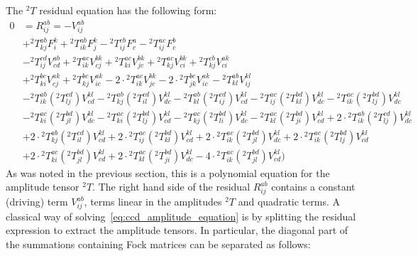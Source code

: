 The ${}^2 T$ residual equation has the following form:
\begin{equation}
\begin{split}
0 & = R^{ab}_{ij} = -V^{ab}_{ij} \\
& + {}^{2}T^{ab}_{kj} F^{k}_{i} 
+ {}^{2}T^{ab}_{ik} F^{k}_{j}
- {}^{2}T^{cb}_{ij} F^{a}_{c} 
- {}^{2}T^{ac}_{ij} F^{b}_{c} \\
& - {}^{2}T^{cd}_{ij}  V^{ab}_{cd}
+ {}^{2}T^{ac}_{ik}  V^{bk}_{cj} 
+ {}^{2}T^{ac}_{ki}  V^{bk}_{jc} 
+ {}^{2}T^{ac}_{kj}  V^{bk}_{ci} 
+ {}^{2}T^{cb}_{kj}  V^{ak}_{ci}\\
&+ {}^{2}T^{bc}_{ki}  V^{ak}_{cj} 
+ {}^{2}T^{bc}_{kj}  V^{ak}_{ic}
- 2 \cdot {}^{2}T^{ac}_{ik}  V^{bk}_{jc}
- 2 \cdot {}^{2}T^{bc}_{jk}  V^{ak}_{ic}
- {}^{2} T^{ab}_{kl}  V^{kl}_{ij} \\
&- {}^{2} T^{ab}_{ik}  ({}^{2} T^{cd}_{lj})  V^{kl}_{cd} 
- {}^{2} T^{ab}_{kj}  ({}^{2} T^{cd}_{il}) V^{kl}_{dc}
- {}^{2} T^{ab}_{kl}  ({}^{2} T^{cd}_{ij}) V^{kl}_{cd}
- {}^{2} T^{ac}_{ij}  ({}^{2} T^{bd}_{kl})  V^{kl}_{dc}
-  {}^{2} T^{ac}_{ik}  ({}^{2} T^{bd}_{lj}) V^{kl}_{dc} \\
&- {}^{2} T^{ac}_{ki}  ({}^{2} T^{bd}_{jl}) V^{kl}_{dc}
- {}^{2} T^{ac}_{ki}  ({}^{2} T^{bd}_{lj}) V^{kl}_{cd}
- {}^{2} T^{ac}_{kj}  ({}^{2} T^{bd}_{li}) V^{kl}_{dc}
-  {}^{2} T^{ac}_{kl}  ({}^{2} T^{bd}_{ji}) V^{kl}_{cd}
+ 2 \cdot {}^{2} T^{ab}_{ik} ({}^{2} T^{cd}_{lj})  V^{kl}_{dc}\\
&+ 2 \cdot {}^{2} T^{ab}_{kj} ({}^{2} T^{cd}_{il})  V^{kl}_{cd}
+ 2 \cdot {}^{2} T^{ac}_{ij} ({}^{2} T^{bd}_{kl})  V^{kl}_{cd}
+ 2 \cdot {}^{2} T^{ac}_{ik} ({}^{2} T^{bd}_{jl})  V^{kl}_{dc}
+ 2 \cdot {}^{2} T^{ac}_{ik} ({}^{2} T^{bd}_{lj})  V^{kl}_{cd}\\  
&+ 2 \cdot {}^{2} T^{ac}_{ki} ({}^{2} T^{bd}_{jl})  V^{kl}_{cd}
+ 2 \cdot {}^{2} T^{ac}_{kl} ({}^{2} T^{bd}_{ji})  V^{kl}_{dc}
- 4 \cdot {}^{2} T^{ac}_{ik} ({}^{2} T^{bd}_{jl})  V^{kl}_{cd})
\end{split}
\label{eq:ccd_amplitude_equation}
\end{equation}  
As was noted in the previous section, this is a polynomial equation 
for the amplitude tensor ${}^2T$. The right hand side of the residual 
$R_{ij}^{ab}$ contains a constant (driving) term $V_{ij}^{ab}$, terms linear in 
the amplitudes ${}^2T$ and quadratic terms. A classical way of 
solving~\ref{eq:ccd_amplitude_equation} is by splitting the residual 
expression to extract the amplitude tensors. In particular, the diagonal part 
of the summations containing Fock matrices can be separated as follows:
